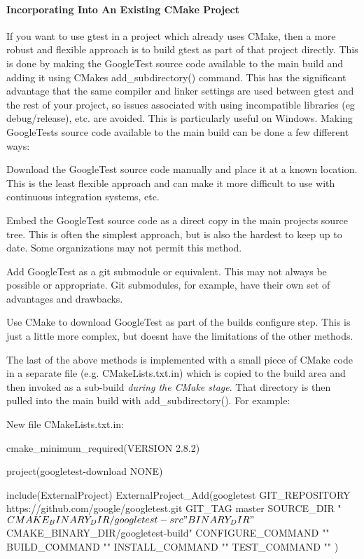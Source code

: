 \paragraph*{Incorporating Into An Existing C\+Make Project}

If you want to use gtest in a project which already uses C\+Make, then a more robust and flexible approach is to build gtest as part of that project directly. This is done by making the Google\+Test source code available to the main build and adding it using C\+Make\textquotesingle{}s {\ttfamily add\+\_\+subdirectory()} command. This has the significant advantage that the same compiler and linker settings are used between gtest and the rest of your project, so issues associated with using incompatible libraries (eg debug/release), etc. are avoided. This is particularly useful on Windows. Making Google\+Test\textquotesingle{}s source code available to the main build can be done a few different ways\+:


\begin{DoxyItemize}
\item Download the Google\+Test source code manually and place it at a known location. This is the least flexible approach and can make it more difficult to use with continuous integration systems, etc.
\item Embed the Google\+Test source code as a direct copy in the main project\textquotesingle{}s source tree. This is often the simplest approach, but is also the hardest to keep up to date. Some organizations may not permit this method.
\item Add Google\+Test as a git submodule or equivalent. This may not always be possible or appropriate. Git submodules, for example, have their own set of advantages and drawbacks.
\item Use C\+Make to download Google\+Test as part of the build\textquotesingle{}s configure step. This is just a little more complex, but doesn\textquotesingle{}t have the limitations of the other methods.
\end{DoxyItemize}

The last of the above methods is implemented with a small piece of C\+Make code in a separate file (e.\+g. {\ttfamily C\+Make\+Lists.\+txt.\+in}) which is copied to the build area and then invoked as a sub-\/build {\itshape during the C\+Make stage}. That directory is then pulled into the main build with {\ttfamily add\+\_\+subdirectory()}. For example\+:

New file {\ttfamily C\+Make\+Lists.\+txt.\+in}\+: \begin{DoxyVerb}cmake_minimum_required(VERSION 2.8.2)

project(googletest-download NONE)

include(ExternalProject)
ExternalProject_Add(googletest
  GIT_REPOSITORY    https://github.com/google/googletest.git
  GIT_TAG           master
  SOURCE_DIR        "${CMAKE_BINARY_DIR}/googletest-src"
  BINARY_DIR        "${CMAKE_BINARY_DIR}/googletest-build"
  CONFIGURE_COMMAND ""
  BUILD_COMMAND     ""
  INSTALL_COMMAND   ""
  TEST_COMMAND      ""
)
\end{DoxyVerb}


